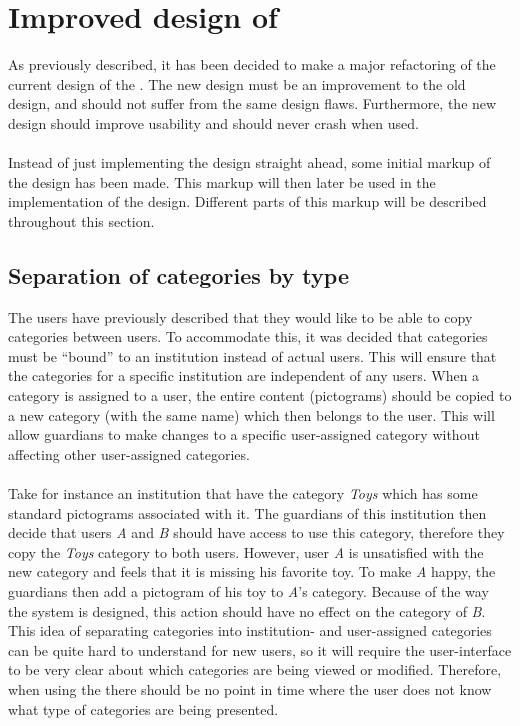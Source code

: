 \section{Improved design of \ct}
\label{sec:improved_design}

As previously described, it has been decided to make a major refactoring of the current design of the \ct. The new design must be an improvement to the old design, and should not suffer from the same design flaws. Furthermore, the new design should improve usability and should never crash when used.
\\\\
Instead of just implementing the design straight ahead, some initial markup of the design has been made. This markup will then later be used in the implementation of the design. Different parts of this markup will be described throughout this section.

\subsection{Separation of categories by type}
The users have previously described that they would like to be able to copy categories between users. To accommodate this, it was decided that categories must  be ``bound'' to an institution instead of actual users. This will ensure that the categories for a specific institution are independent of any users. When a category is assigned to a user, the entire content (pictograms) should be copied to a new category (with the same name) which then belongs to the user. This will allow guardians to make changes to a specific user-assigned category without affecting other user-assigned categories. 
\\\\
Take for instance an institution that have the category \emph{Toys} which has some standard pictograms associated with it. The guardians of this institution then decide that users \emph{A} and \emph{B} should have access to use this category, therefore they copy the \emph{Toys} category to both users. However, user \emph{A} is unsatisfied with the new category and feels that it is missing his favorite toy. To make \emph{A} happy, the guardians then add a pictogram of his toy to \emph{A}'s category. Because of the way the system is designed, this action should have no effect on the category of \emph{B}. \\

This idea of separating categories into institution- and user-assigned categories can be quite hard to understand for new users, so it will require the user-interface to be very clear about which categories are being viewed or modified. Therefore, when using the \ct there should be no point in time where the user does not know what type of categories are being presented.

